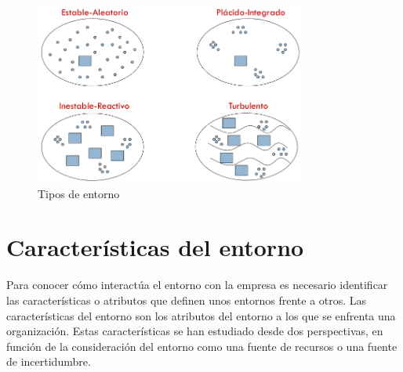 \documentclass[10pt,a4paper,spanish]{report}
\begin{document}
            \begin{figure}
                  \centering
                  \includegraphics[width=0.8\textwidth]{1}
                  \caption{Tipos de entorno}
                  \label{tipos_entorno}
            \end{figure}

    \section{\textcolor[rgb]{0.3,0.4,0.6}Características del entorno}

        Para conocer cómo interactúa el entorno con la empresa es necesario identificar las características o atributos que definen unos entornos frente a otros. Las características del entorno son los atributos del entorno a los que se enfrenta una organización. Estas características se han estudiado desde dos perspectivas, en función de la consideración del entorno como una fuente de recursos o una fuente de incertidumbre.
\end{document}
